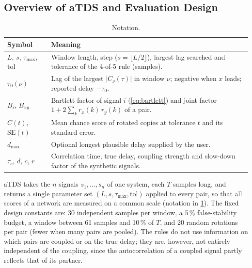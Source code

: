 \documentclass[11pt,a4paper]{article}
\begin{document}
\subsection{Overview of aTDS and Evaluation Design}
\label{sec:tests}
\begin{table}[t]
\centering
\caption{Notation.}
\label{tab:notation}
\footnotesize
\begin{tabularx}{\textwidth}{>{\raggedright\arraybackslash}p{2.6cm}>{\raggedright\arraybackslash}X}
\toprule
Symbol & Meaning \\
\midrule
$L$, $s$, $\tau_{\max}$, $\mathrm{tol}$ & Window length, step ($s = \lfloor L/2 \rfloor$), largest lag searched and tolerance of the 4-of-5 rule (samples). \\
$\tau_0(\nu)$ & Lag of the largest $|C_\nu(\tau)|$ in window $\nu$; negative when $x$ leads; reported delay $-\tau_0$. \\
$B_i$, $B_{xy}$ & Bartlett factor of signal $i$ (\cref{eq:bartlett}) and joint factor $1 + 2\sum_k r_x(k)\,r_y(k)$ of a pair. \\
$C(t)$, $\mathrm{SE}(t)$ & Mean chance score of rotated copies at tolerance $t$ and its standard error. \\
$d_{\max}$ & Optional longest plausible delay supplied by the user. \\
$\tau_c$, $d$, $c$, $r$ & Correlation time, true delay, coupling strength and slow-down factor of the synthetic signals. \\
\bottomrule
\end{tabularx}
\end{table}
aTDS takes the $n$ signals $s_1, \dots, s_n$ of one system, each $T$ samples long, and returns a single parameter set $(L, s, \tau_{\max}, \mathrm{tol})$ applied to every pair, so that all scores of a network are measured on a common scale (notation in \cref{tab:notation}). The fixed design constants are: 30 independent samples per window, a 5\,\% false-stability budget, a window between 61 samples and 10\,\% of $T$, and 20 random rotations per pair (fewer when many pairs are pooled). The rules do not use information on which pairs are coupled or on the true delay; they are, however, not entirely independent of the coupling, since the autocorrelation of a coupled signal partly reflects that of its partner.
\end{document}
